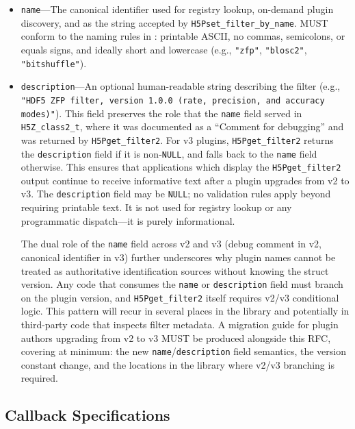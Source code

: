 \documentclass[../HDF5_RFC.tex]{subfiles}
\begin{document}

\begin{itemize}
\item \texttt{name}---The canonical identifier used for registry lookup, on-demand
  plugin discovery, and as the string accepted by
  \texttt{H5Pset\_filter\_by\_name}. MUST conform to the naming rules in
  : printable ASCII, no commas, semicolons, or
  equals signs, and ideally short and lowercase (e.g., \texttt{"zfp"},
  \texttt{"blosc2"}, \texttt{"bitshuffle"}).
\item \texttt{description}---An optional human-readable string describing the
  filter (e.g., \texttt{"HDF5 ZFP filter, version 1.0.0 (rate, precision, and
  accuracy modes)"}). This field preserves the role that the \texttt{name} field
  served in \texttt{H5Z\_class2\_t}, where it was documented as a ``Comment for
  debugging'' and was returned by \texttt{H5Pget\_filter2}. For v3 plugins,
  \texttt{H5Pget\_filter2} returns the \texttt{description} field if it is
  non-\texttt{NULL}, and falls back to the \texttt{name} field otherwise. This
  ensures that applications which display the \texttt{H5Pget\_filter2} output
  continue to receive informative text after a plugin upgrades from v2 to v3.
  The \texttt{description} field may be \texttt{NULL}; no validation rules apply
  beyond requiring printable text. It is not used for registry lookup or
  any programmatic dispatch---it is purely informational.

  The dual role of the \texttt{name} field across v2 and v3 (debug comment
  in v2, canonical identifier in v3) further underscores why plugin names
  cannot be treated as authoritative identification sources without knowing
  the struct version.  Any code that consumes the \texttt{name} or
  \texttt{description} field must branch on the plugin version, and
  \texttt{H5Pget\_filter2} itself requires v2/v3 conditional logic.  This
  pattern will recur in several places in the library and potentially in
  third-party code that inspects filter metadata.  A migration guide for
  plugin authors upgrading from v2 to v3 MUST be produced alongside this
  RFC, covering at minimum: the new \texttt{name}/\texttt{description} field
  semantics, the version constant change, and the locations in the library
  where v2/v3 branching is required.
\end{itemize}

\subsection{Callback Specifications}
\label{sec:callback-specs}
\end{document}

